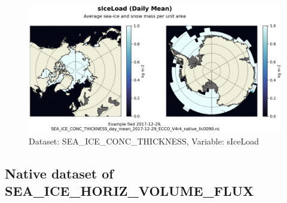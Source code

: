 \begin{figure}[H]
\centering
\includegraphics[scale=0.55]{../images/plots/native_plots/Sea-Ice_and_Snow_Concentration_and_Thickness/sIceLoad.png}
\caption{Dataset: SEA\_ICE\_CONC\_THICKNESS, Variable: sIceLoad}
\label{tab:table-SEA_ICE_CONC_THICKNESS_sIceLoad-Plot}
\end{figure}
\subsection{Native dataset of SEA\_ICE\_HORIZ\_VOLUME\_FLUX}
\newp
